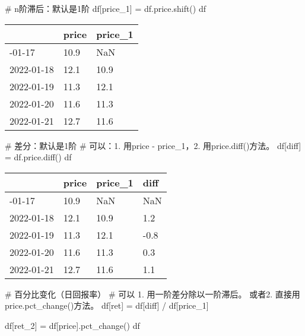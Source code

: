 \documentclass[
  letterpaper,
  DIV=11,
  numbers=noendperiod]{scrreprt}
\newenvironment{Shaded}{\begin{snugshade}}{\end{snugshade}}
\newcommand{\CommentTok}[1]{\textcolor[rgb]{0.37,0.37,0.37}{#1}}
\newcommand{\NormalTok}[1]{\textcolor[rgb]{0.00,0.23,0.31}{#1}}
\newcommand{\OperatorTok}[1]{\textcolor[rgb]{0.37,0.37,0.37}{#1}}
\newcommand{\StringTok}[1]{\textcolor[rgb]{0.13,0.47,0.30}{#1}}
\begin{document}
\begin{Shaded}
\begin{Highlighting}[]
\CommentTok{\# n阶滞后：默认是1阶}
\NormalTok{df[}\StringTok{\textquotesingle{}price\_1\textquotesingle{}}\NormalTok{] }\OperatorTok{=}\NormalTok{ df.price.shift()}
\NormalTok{df}
\end{Highlighting}
\end{Shaded}

\begin{longtable}[]{@{}lll@{}}
\toprule\noalign{}
& price & price\_1 \\
\midrule\noalign{}
\endhead
\bottomrule\noalign{}
\endlastfoot
2022-01-17 & 10.9 & NaN \\
2022-01-18 & 12.1 & 10.9 \\
2022-01-19 & 11.3 & 12.1 \\
2022-01-20 & 11.6 & 11.3 \\
2022-01-21 & 12.7 & 11.6 \\
\end{longtable}

\begin{Shaded}
\begin{Highlighting}[]
\CommentTok{\# 差分：默认是1阶}
\CommentTok{\# 可以：1. 用price {-} price\_1，2. 用price.diff()方法。}
\NormalTok{df[}\StringTok{\textquotesingle{}diff\textquotesingle{}}\NormalTok{] }\OperatorTok{=}\NormalTok{ df.price.diff()}
\NormalTok{df}
\end{Highlighting}
\end{Shaded}

\begin{longtable}[]{@{}llll@{}}
\toprule\noalign{}
& price & price\_1 & diff \\
\midrule\noalign{}
\endhead
\bottomrule\noalign{}
\endlastfoot
2022-01-17 & 10.9 & NaN & NaN \\
2022-01-18 & 12.1 & 10.9 & 1.2 \\
2022-01-19 & 11.3 & 12.1 & -0.8 \\
2022-01-20 & 11.6 & 11.3 & 0.3 \\
2022-01-21 & 12.7 & 11.6 & 1.1 \\
\end{longtable}

\begin{Shaded}
\begin{Highlighting}[]
\CommentTok{\# 百分比变化（日回报率）}
\CommentTok{\# 可以 1. 用一阶差分除以一阶滞后。 或者2. 直接用price.pct\_change()方法。}
\NormalTok{df[}\StringTok{\textquotesingle{}ret\textquotesingle{}}\NormalTok{] }\OperatorTok{=}\NormalTok{ df[}\StringTok{\textquotesingle{}diff\textquotesingle{}}\NormalTok{] }\OperatorTok{/}\NormalTok{ df[}\StringTok{\textquotesingle{}price\_1\textquotesingle{}}\NormalTok{]}

\NormalTok{df[}\StringTok{\textquotesingle{}ret\_2\textquotesingle{}}\NormalTok{] }\OperatorTok{=}\NormalTok{ df[}\StringTok{\textquotesingle{}price\textquotesingle{}}\NormalTok{].pct\_change()}
\NormalTok{df}
\end{Highlighting}
\end{Shaded}
\end{document}
